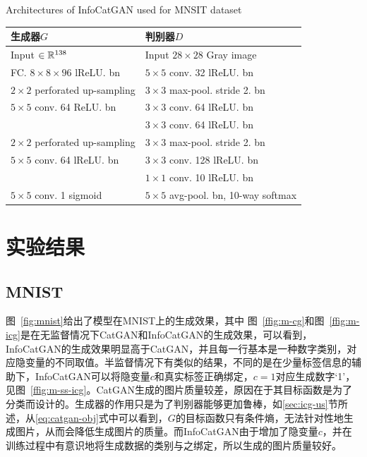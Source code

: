\begin{table}[h]
  \renewcommand\arraystretch{0.7} %
  \centering
  {Architectures of InfoCatGAN used for MNSIT dataset}
  \begin{tabular}{l|l}
    \toprule
    \textbf{生成器$G$}                    & \textbf{判别器$D$} \\
    \midrule
    Input $\in \mathbb{R}^{138}$              & Input $28\times 28$ Gray image \\ \hline
    FC. $8\times8\times96$ lReLU. bn      & $5\times 5$ conv. 32 lReLU. bn \\ \hline
    $2\times2$ perforated up-sampling    & $3\times 3$ max-pool. stride 2. bn \\ \hline
    $5\times 5$ conv. 64 ReLU. bn        & $3\times 3$ conv. 64 lReLU. bn \\ 
    ~                                    & $3\times 3$ conv. 64 lReLU. bn \\ \hline
    $2\times 2$ perforated up-sampling   & $3\times 3$ max-pool. stride 2. bn \\ \hline
    $5\times 5$ conv. 64 lReLU. bn		  & $3\times 3$ conv. 128 lReLU. bn \\ 
    ~                        			  & $1\times 1$ conv. 10 lReLU. bn \\
    $5\times 5$ conv. 1 sigmoid		     & $5\times 5$ avg-pool. bn, 10-way softmax \\
    \bottomrule
  \end{tabular}
  \label{tab:m-icg-netarch}
\end{table}

\section{实验结果}\label{sec:results}

\subsection{MNIST}\label{sec:icg-ex}

图~\ref{fig:mnist}给出了模型在MNIST上的生成效果，其中
图~\ref{ffig:m-cg}和图~\ref{ffig:m-icg}是在无监督情况下CatGAN和InfoCatGAN的生成效果，可以看到，InfoCatGAN的生成效果明显高于CatGAN，并且每一行基本是一种数字类别，对应隐变量的不同取值。半监督情况下有类似的结果，不同的是在少量标签信息的辅助下，InfoCatGAN可以将隐变量$c$和真实标签正确绑定，$c=1$对应生成数字`1'，见图~\ref{ffig:m-ss-icg}。CatGAN生成的图片质量较差，原因在于其目标函数是为了分类而设计的。生成器的作用只是为了判别器能够更加鲁棒，如\ref{sec:icg-us}节所述，从\eqref{eq:catgan-obj}式中可以看到，$G$的目标函数只有条件熵，无法针对性地生成图片，从而会降低生成图片的质量。而InfoCatGAN由于增加了隐变量$c$，并在训练过程中有意识地将生成数据的类别与之绑定，所以生成的图片质量较好。

